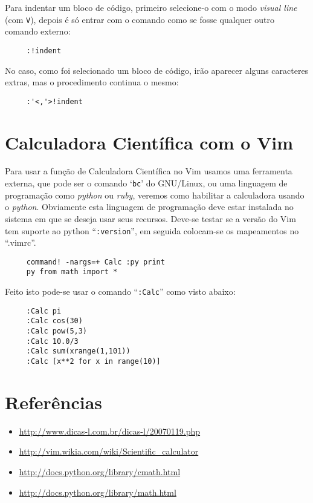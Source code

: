 Para indentar um bloco de código, primeiro selecione-o com o modo {\em visual line} (com {\tt V}), 
depois é só entrar com o comando como se fosse qualquer outro comando externo:
\begin{verbatim}
     :!indent
\end{verbatim}

No caso, como foi selecionado um bloco de código, irão aparecer alguns caracteres extras, 
mas o procedimento continua o mesmo:
\begin{verbatim}
     :'<,'>!indent
\end{verbatim}


\section{Calculadora Científica com o Vim}
\label{sec:Calculadora Científica com o Vim}

Para usar a função de Calculadora Científica no Vim usamos uma ferramenta
externa, que pode ser o comando `{\tt bc}' do GNU/Linux, ou uma linguagem de
programação como {\em python} ou {\em ruby}, veremos como habilitar a
calculadora usando o {\em python}. Obviamente esta linguagem de programação
deve estar instalada no sistema em que se deseja usar seus recursos.  Deve-se
testar se a versão do Vim tem suporte ao python ``\verb+:version+'', em seguida
colocam-se os mapeamentos no ``.vimrc''.

\begin{verbatim}
     command! -nargs=+ Calc :py print 
     py from math import *
\end{verbatim}

Feito isto pode-se usar o comando ``{\tt :Calc}'' como visto abaixo:

\begin{verbatim}
     :Calc pi
     :Calc cos(30)
     :Calc pow(5,3)
     :Calc 10.0/3
     :Calc sum(xrange(1,101))
     :Calc [x**2 for x in range(10)] 
\end{verbatim}


\section{Referências}

\begin{itemize}
 \item \url{http://www.dicas-l.com.br/dicas-l/20070119.php}
 \item \url{http://vim.wikia.com/wiki/Scientific_calculator}
 \item \url{http://docs.python.org/library/cmath.html}
 \item \url{http://docs.python.org/library/math.html}
\end{itemize}

